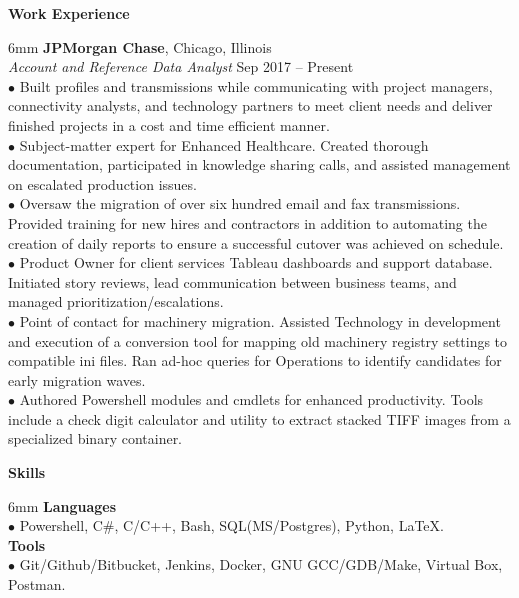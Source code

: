 \documentclass[11pt]{article}
\newcommand{\sectionheader}[1]{\noindent \textbf{\large #1}}
\newenvironment{sectionbody}{\begin{adjustwidth}{6mm}{}}{\end{adjustwidth}}
\begin{document}
\vspace{2mm}

\sectionheader{Work Experience}
\begin{sectionbody}
{\bf JPMorgan Chase}, Chicago, Illinois \\
\textit{Account and Reference Data Analyst} \hfill Sep 2017 -- Present \\
$\bullet$ Built profiles and transmissions while communicating with project managers, connectivity analysts, and technology partners to meet client needs and deliver finished projects in a cost and time efficient manner. \\
$\bullet$ Subject-matter expert for Enhanced Healthcare. Created thorough documentation, participated in knowledge sharing calls, and assisted management on escalated production issues. \\
$\bullet$ Oversaw the migration of over six hundred email and fax transmissions. Provided training for new hires and contractors in addition to automating the creation of daily reports to ensure a successful cutover was achieved on schedule. \\
$\bullet$ Product Owner for client services Tableau dashboards and support database. Initiated story reviews, lead communication between business teams, and managed prioritization/escalations. \\
$\bullet$ Point of contact for machinery migration. Assisted Technology in development and execution of a conversion tool for mapping old machinery registry settings to compatible ini files. Ran ad-hoc queries for Operations to identify candidates for early migration waves. \\
$\bullet$ Authored Powershell modules and cmdlets for enhanced productivity. Tools include a check digit calculator and utility to extract stacked TIFF images from a specialized binary container. \\
\end{sectionbody}

\vspace{2mm}

\sectionheader{Skills}
\begin{sectionbody}
{\bf Languages} \\
$\bullet$ Powershell, C\#, C/C++, Bash, SQL(MS/Postgres), Python, \LaTeX. \\
{\bf Tools} \\
$\bullet$ Git/Github/Bitbucket, Jenkins, Docker, GNU GCC/GDB/Make, Virtual Box, Postman.
\end{sectionbody}
\end{document}
